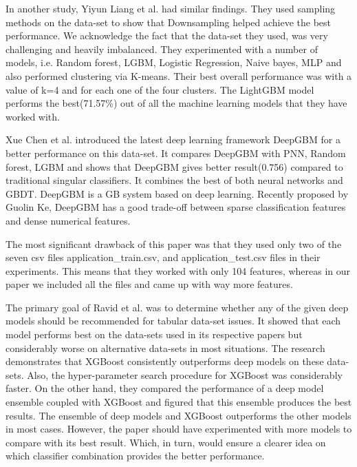 \documentclass[sigconf, nonacm]{acmart}
\begin{document}
In another study, Yiyun Liang et al. \cite{Liang2019LoanlinessPL} had similar findings. They used sampling methods on the data-set to show that Downsampling helped achieve the best performance. We acknowledge the fact that the data-set they used, was very challenging and heavily imbalanced. They experimented with a number of models, i.e. Random forest, LGBM, Logistic Regression, Naive bayes, MLP and also performed clustering via K-means. Their best overall performance was with a value of k=4 and for each one of the four clusters. The LightGBM model performs the best(71.57\%) out of all the  machine learning models that they have worked with.


Xue Chen et al. \cite{10.1145/3366194.3366333} introduced the latest deep learning framework DeepGBM for a better performance on this data-set. It compares DeepGBM with PNN, Random forest, LGBM  and shows that DeepGBM gives better result(0.756) compared to traditional singular classifiers. It combines the best of both neural networks and GBDT. DeepGBM is a GB system based on deep learning. Recently proposed by Guolin Ke, DeepGBM\cite{deepgbm} has a good trade-off between sparse classification features and dense numerical features. 

The most significant drawback of this paper was that they used only two of the seven csv files application\_train.csv, and application\_test.csv files in their experiments. This means that they worked with only 104 features, whereas in our paper we included all the files and came up with way more features.


The primary goal of Ravid et al. \cite{shwartzziv2021tabular}   was to determine whether any of the given deep models should be recommended for tabular data-set issues. It showed that each model performs best on the data-sets used in its respective papers but considerably worse on alternative data-sets in most situations. The research demonstrates that XGBoost consistently outperforms deep models on these data-sets. Also, the hyper-parameter search procedure for XGBoost was considerably faster. On the other hand, they compared the performance of a deep model ensemble coupled with XGBoost and figured that this ensemble produces the best results. The ensemble of deep models and XGBoost outperforms the other models in most cases. However, the paper should have experimented with more models to compare with its best result. Which, in turn, would ensure a clearer idea on which classifier combination provides the better performance.
\end{document}
